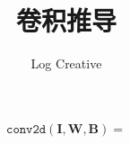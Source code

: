 \documentclass{ctexart}
\begin{document}
    \title{卷积推导}
    \author{Log Creative}
    \date{}
    \maketitle
    \begin{equation}
        \texttt{conv2d}(\mathbf{I},\mathbf{W},\mathbf{B})=
    \end{equation}
\end{document}
